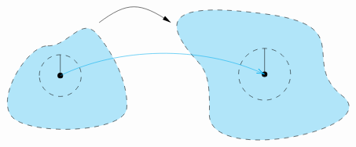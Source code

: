 \documentclass[12pt]{article}
\begin{document}
\begin{theorem}
\[\begin{tikzpicture}[x=0.75pt,y=0.75pt,yscale=-.9,xscale=.9]
        \draw  [fill=cyan  ,fill opacity=0.3 ][dash pattern={on 4.5pt off 4.5pt}] (112.5,123.5) .. controls (141.5,124.5) and (159.5,80.5) .. (182,108) .. controls (204.5,135.5) and (224.91,176.75) .. (222.42,210.25) .. controls (219.92,243.75) and (99.59,248.75) .. (67.08,226.25) .. controls (34.58,203.75) and (83.5,122.5) .. (112.5,123.5) -- cycle ;
        \draw  [fill=cyan  ,fill opacity=0.3 ][dash pattern={on 4.5pt off 4.5pt}] (301.25,120.25) .. controls (278.25,84.25) and (291.25,62.25) .. (417.25,79.25) .. controls (543.25,96.25) and (462.25,146.25) .. (522.25,193.25) .. controls (582.25,240.25) and (335.25,291.25) .. (337.25,218.25) .. controls (339.25,145.25) and (324.25,156.25) .. (301.25,120.25) -- cycle ;
        \draw    (184,91) .. controls (223.6,61.3) and (240.91,62.23) .. (282.73,90.15) ;
        \draw [shift={(284,91)}, rotate = 213.92] [fill=black  ][line width=0.08]  [draw opacity=0] (12,-3) -- (0,0) -- (12,3) -- cycle    ;
        \draw  [dash pattern={on 4.5pt off 4.5pt}] (100.87,165) .. controls (100.87,148.91) and (113.91,135.87) .. (130,135.87) .. controls (146.09,135.87) and (159.13,148.91) .. (159.13,165) .. controls (159.13,181.09) and (146.09,194.13) .. (130,194.13) .. controls (113.91,194.13) and (100.87,181.09) .. (100.87,165) -- cycle ;
        \draw  [dash pattern={on 4.5pt off 4.5pt}] (378,163.13) .. controls (378,143.18) and (394.18,127) .. (414.13,127) .. controls (434.08,127) and (450.26,143.18) .. (450.26,163.13) .. controls (450.26,183.08) and (434.08,199.26) .. (414.13,199.26) .. controls (394.18,199.26) and (378,183.08) .. (378,163.13) -- cycle ;
        \draw    (130,135.87) -- (130,165) ;
        \draw [shift={(130,165)}, rotate = 90] [color=black  ][fill=black  ][line width=0.75]      (0, 0) circle [x radius= 3.35, y radius= 3.35]   ;
        \draw    (414.13,127) -- (414.13,163.13) ;
        \draw [shift={(414.13,163.13)}, rotate = 90] [color=black  ][fill=black  ][line width=0.75]      (0, 0) circle [x radius= 3.35, y radius= 3.35]   ;
        \draw [color=cyan  ,draw opacity=1 ]   (130,165) .. controls (209.85,126.09) and (324.11,121.93) .. (412.79,162.51) ;
        \draw [shift={(414.13,163.13)}, rotate = 204.89] [color=cyan  ,draw opacity=1 ][line width=0.75]    (10.93,-3.29) .. controls (6.95,-1.4) and (3.31,-0.3) .. (0,0) .. controls (3.31,0.3) and (6.95,1.4) .. (10.93,3.29)   ;

\end{tikzpicture}\]
\end{theorem}
\end{document}
